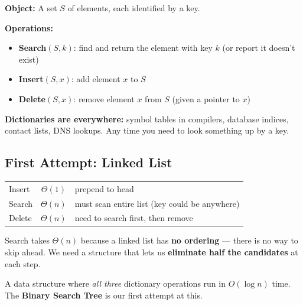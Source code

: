 \documentclass[11pt]{article}
\begin{document}
\begin{defbox}
\textbf{Object:} A set $S$ of elements, each identified by a \textcolor{rustW}{key}.

\textbf{Operations:}
\begin{itemize}[leftmargin=1.4em,itemsep=1pt]
    \item \textcolor{heapblue}{\textbf{Search$(S, k)$}}: find and return the element with key $k$ (or report it doesn't exist)
    \item \textcolor{heapblue}{\textbf{Insert$(S, x)$}}: add element $x$ to $S$
    \item \textcolor{heapblue}{\textbf{Delete$(S, x)$}}: remove element $x$ from $S$ (given a pointer to $x$)
\end{itemize}
\end{defbox}

\textbf{Dictionaries are everywhere:} symbol tables in compilers, database indices, contact lists, DNS lookups. Any time you need to look something up by a key.

\subsection{First Attempt: Linked List}

\begin{center}
\renewcommand{\arraystretch}{1.4}
\begin{tabular}{l c l}
Insert & \textcolor{greenO}{$\Theta(1)$} & prepend to head \\
Search & \textcolor{rustW}{$\Theta(n)$} & must scan entire list (key could be anywhere) \\
Delete & \textcolor{rustW}{$\Theta(n)$} & need to search first, then remove \\
\end{tabular}
\end{center}

Search takes $\Theta(n)$ because a linked list has \textbf{no ordering} — there is no way to skip ahead. We need a structure that lets us \textbf{eliminate half the candidates} at each step.

\begin{keybox}[Goal]
A data structure where \textit{all three} dictionary operations run in \textcolor{greenO}{$O(\log n)$} time. The \textbf{Binary Search Tree} is our first attempt at this.
\end{keybox}

\end{document}
